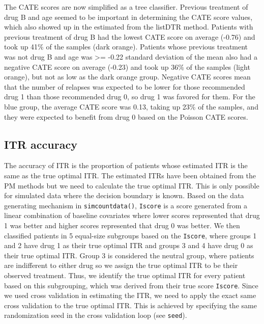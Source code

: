 \documentclass[
  letterpaper,
  DIV=11,
  numbers=noendperiod]{scrreprt}
\begin{document}
The CATE scores are now simplified as a tree classifier. Previous
treatment of drug B and age seemed to be important in determining the
CATE score values, which also showed up in the estimated from the
listDTR method. Patients with previous treatment of drug B had the
lowest CATE score on average (-0.76) and took up 41\% of the samples
(dark orange). Patients whose previous treatment was not drug B and age
was \textgreater= -0.22 standard deviation of the mean also had a
negative CATE score on average (-0.23) and took up 36\% of the samples
(light orange), but not as low as the dark orange group. Negative CATE
scores mean that the number of relapses was expected to be lower for
those recommended drug 1 than those recommended drug 0, so drug 1 was
favored for them. For the blue group, the average CATE score was 0.13,
taking up 23\% of the samples, and they were expected to benefit from
drug 0 based on the Poisson CATE scores.

\hypertarget{itr-accuracy}{%
\subsection{ITR accuracy}\label{itr-accuracy}}

The accuracy of ITR is the proportion of patients whose estimated ITR is
the same as the true optimal ITR. The estimated ITRs have been obtained
from the PM methods but we need to calculate the true optimal ITR. This
is only possible for simulated data where the decision boundary is
known. Based on the data generating mechanism in
\texttt{simcountdata()}, \texttt{Iscore} is a score generated from a
linear combination of baseline covariates where lower scores represented
that drug 1 was better and higher scores represented that drug 0 was
better. We then classified patients in 5 equal-size subgroups based on
the \texttt{Iscore}, where groups 1 and 2 have drug 1 as their true
optimal ITR and groups 3 and 4 have drug 0 as their true optimal ITR.
Group 3 is considered the neutral group, where patients are indifferent
to either drug so we assign the true optimal ITR to be their observed
treatment. Thus, we identify the true optimal ITR for every patient
based on this subgrouping, which was derived from their true score
\texttt{Iscore}. Since we used cross validation in estimating the ITR,
we need to apply the exact same cross validation to the true optimal
ITR. This is achieved by specifying the same randomization seed in the
cross validation loop (see \texttt{seed}).
\end{document}
